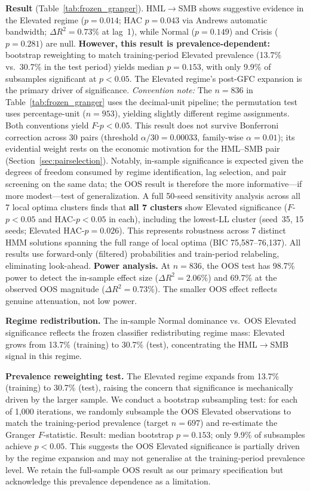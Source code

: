 \documentclass[sigconf,anonymous]{acmart}
\begin{document}
\textbf{Result} (Table~\ref{tab:frozen_granger}). HML$\to$SMB shows suggestive evidence in the Elevated regime
($p = 0.014$; HAC $p = 0.043$ via Andrews automatic bandwidth; $\Delta R^2 = 0.73\%$ at lag~1),
while Normal ($p = 0.149$) and Crisis ($p = 0.281$) are null.
\textbf{However, this result is prevalence-dependent:} bootstrap reweighting to match
training-period Elevated prevalence (13.7\% vs.\ 30.7\% in the test period)
yields median $p = 0.153$, with only 9.9\% of subsamples significant at $p < 0.05$.
The Elevated regime's post-GFC expansion is the primary driver of significance.
\emph{Convention note:} The $n = 836$ in Table~\ref{tab:frozen_granger} uses the
decimal-unit pipeline; the permutation test uses percentage-unit ($n = 953$), yielding
slightly different regime assignments. Both conventions yield $F$-$p < 0.05$.
This result does not survive Bonferroni correction across 30 pairs
(threshold $\alpha/30 = 0.00033$, family-wise $\alpha = 0.01$); its evidential weight
rests on the economic motivation for the HML--SMB pair
(Section~\ref{sec:pairselection}).
Notably, in-sample significance is expected given the degrees of freedom consumed
by regime identification, lag selection, and pair screening on the same data;
the OOS result is therefore the more informative---if more modest---test of
generalization.
A full 50-seed sensitivity analysis across all 7 local optima clusters finds that
\textbf{all 7 clusters} show Elevated significance ($F$-$p < 0.05$ and HAC-$p < 0.05$
in each), including the lowest-LL cluster (seed~35, 15 seeds; Elevated HAC-$p = 0.026$).
This represents robustness across 7 distinct HMM solutions spanning the full
range of local optima (BIC 75{,}587--76{,}137).
All results use forward-only (filtered) probabilities and train-period relabeling,
eliminating look-ahead.
\textbf{Power analysis.} At $n = 836$, the OOS test has 98.7\% power to detect
the in-sample effect size ($\Delta R^2 = 2.06\%$) and 69.7\% at the observed
OOS magnitude ($\Delta R^2 = 0.73\%$). The smaller OOS effect reflects genuine
attenuation, not low power.

\textbf{Regime redistribution.} The in-sample Normal dominance vs.\ OOS Elevated
significance reflects the frozen classifier redistributing regime mass:
Elevated grows from 13.7\% (training) to 30.7\% (test), concentrating the
HML$\to$SMB signal in this regime.

\textbf{Prevalence reweighting test.}
The Elevated regime expands from 13.7\% (training) to 30.7\% (test),
raising the concern that significance is mechanically driven by the larger sample.
We conduct a bootstrap subsampling test: for each of 1{,}000 iterations, we randomly
subsample the OOS Elevated observations to match the training-period prevalence
(target $n = 697$) and re-estimate the Granger $F$-statistic.
Result: median bootstrap $p = 0.153$; only 9.9\% of subsamples achieve $p < 0.05$.
This suggests the OOS Elevated significance is partially driven by the regime expansion
and may not generalise at the training-period prevalence level.
We retain the full-sample OOS result as our primary specification but acknowledge
this prevalence dependence as a limitation.
\end{document}
